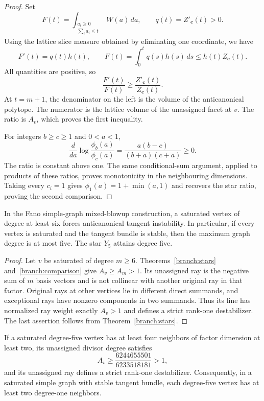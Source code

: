 \begin{proof}
Set
\[
 F(t)=\int_{\substack{a_i\ge0\\\sum_i a_i\le t}}W(a)\,da,
 \qquad q(t)=Z'_{\mathbf c}(t)>0.
\]
Using the lattice slice measure obtained by eliminating one coordinate,
we have
\[
 F'(t)=q(t)h(t),\qquad
 F(t)=\int_0^tq(s)h(s)\,ds
 \le h(t)Z_{\mathbf c}(t).
\]
All quantities are positive, so
\[
 \frac{F'(t)}{F(t)}\ge\frac{Z'_{\mathbf c}(t)}{Z_{\mathbf c}(t)}.
\]
At $t=m+1$, the denominator on the left is the volume of the
anticanonical polytope. The numerator is the lattice volume of the
unassigned facet at $v$. The ratio is $A_v$, which proves the first
inequality.

For integers $b\ge c\ge1$ and $0<a<1$,
\[
 \frac{d}{da}\log\frac{\phi_b(a)}{\phi_c(a)}
 =\frac{a(b-c)}{(b+a)(c+a)}\ge0.
\]
The ratio is constant above one. The same conditional-sum argument,
applied to products of these ratios, proves monotonicity in the
neighbouring dimensions. Taking every $c_i=1$ gives
$\phi_1(a)=1+\min(a,1)$ and recovers the star ratio, proving the
second comparison.
\end{proof}

\begin{corollary}\label{branch:obstruction}
In the Fano simple-graph mixed-blowup construction, a saturated vertex of
degree at least six forces anticanonical tangent instability. In
particular, if every vertex is saturated and the tangent bundle is
stable, then the maximum graph degree is at most five. The star $Y_5$
attains degree five.
\end{corollary}

\begin{proof}
Let $v$ be saturated of degree $m\ge6$. Theorems~\ref{branch:stars}
and~\ref{branch:comparison} give $A_v\ge A_m>1$. Its unassigned ray
is the negative sum of $m$ basis vectors and is not collinear with
another original ray in that factor. Original rays at other vertices
lie in different direct summands, and exceptional rays have nonzero
components in two summands. Thus its line has normalized ray weight
exactly $A_v>1$ and defines a strict rank-one destabilizer.
The last assertion follows from Theorem~\ref{branch:stars}.
\end{proof}

\begin{corollary}\label{branch:degree-five}
If a saturated degree-five vertex has at least four neighbors of factor
dimension at least two, its unassigned divisor degree satisfies
\[
 A_v\ge\frac{6244655501}{6233518181}>1,
\]
and its unassigned ray defines a strict rank-one destabilizer.
Consequently, in a saturated simple graph with stable tangent bundle,
each degree-five vertex has at least two degree-one neighbors.
\end{corollary}

